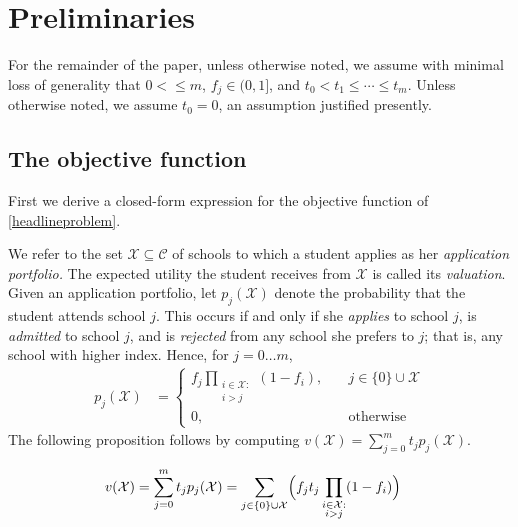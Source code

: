\section{Preliminaries} \label{sectionModel}

For the remainder of the paper, unless otherwise noted, we assume with minimal loss of generality that $0 < \leq m$, $f_j \in (0, 1]$, and $t_0 < t_1 \leq \cdots \leq t_m$. Unless otherwise noted, we assume $t_0 = 0$, an assumption justified presently. 

\subsection{The objective function} \label{sectionObjective}

First we derive a closed-form expression for the objective function of \eqref{headlineproblem}.

We refer to the set $\mathcal{X} \subseteq \mathcal{C}$ of schools to which a student applies as her \emph{application portfolio.} The expected utility the student receives from $\mathcal{X}$ is called its \emph{valuation}. Given an application portfolio, let $p_j(\mathcal{X})$ denote the probability that the student attends school $j$. This occurs if and only if she \emph{applies} to school $j$, is \emph{admitted} to school $j$, and is \emph{rejected} from any school she prefers to $j$; that is, any school with higher index. Hence, for $j= 0\dots m$,
\begin{align*}
p_j(\mathcal{X}) &= 
\begin{cases}
\displaystyle f_j  \prod_{\substack{i \in \mathcal{X}: \\ i > j}} (1 - f_{i}), \quad & j \in \{0\}\cup\mathcal{X}\\
0, \quad & \text{otherwise}
\end{cases} 
\end{align*}
The following proposition follows by computing $v(\mathcal{X}) = \sum_{j=0}^m  t_j p_j(\mathcal{X})$.
\begin{proposition}
\begin{align*}
v(\mathcal{X}) &= \sum_{j=0}^m t_j p_j(\mathcal{X}) = \sum_{j\in\{0\}\cup\mathcal{X}} \Bigl( f_j t_j \prod_{\substack{i \in \mathcal{X}: \\ i > j}} (1 - f_{i}) \Bigr)  \label{closedformportfoliovaluationX}%
\end{align*}
\end{proposition}

